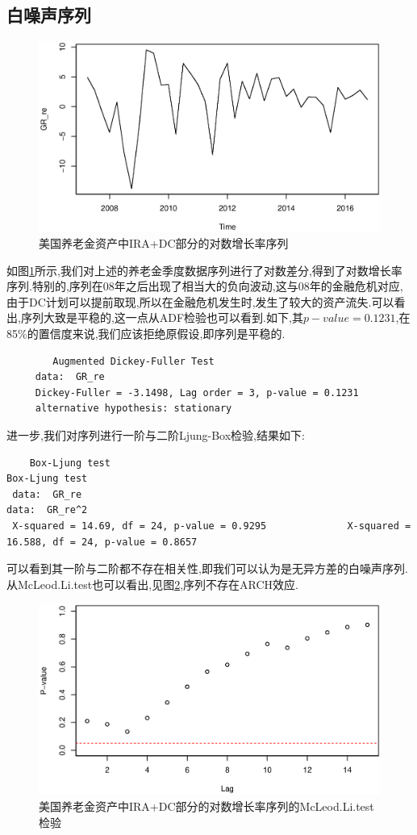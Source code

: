 \subsection{白噪声序列}
\begin{figure}[h!]
	\centering
	\includegraphics[width=0.5\linewidth]{pic/re/grre}
	\caption{美国养老金资产中IRA+DC部分的对数增长率序列}
	\label{fig:grre}
\end{figure}
如图\ref{fig:grre}所示,我们对上述的养老金季度数据序列进行了对数差分,得到了对数增长率序列.特别的,序列在08年之后出现了相当大的负向波动,这与08年的金融危机对应,由于DC计划可以提前取现,所以在金融危机发生时,发生了较大的资产流失.可以看出,序列大致是平稳的,这一点从ADF检验也可以看到.如下,其$p-value = 0.1231$,在85\%的置信度来说,我们应该拒绝原假设,即序列是平稳的.
\begin{framed}
	\begin{verbatim}
	 	Augmented Dickey-Fuller Test 
	 data:  GR_re
	 Dickey-Fuller = -3.1498, Lag order = 3, p-value = 0.1231
	 alternative hypothesis: stationary
	\end{verbatim}
\end{framed}
进一步,我们对序列进行一阶与二阶Ljung-Box检验,结果如下:
\begin{framed}
	\begin{verbatim}
 	Box-Ljung test                                                   Box-Ljung test
 data:  GR_re                                                       data:  GR_re^2
 X-squared = 14.69, df = 24, p-value = 0.9295              X-squared = 16.588, df = 24, p-value = 0.8657
	\end{verbatim}
\end{framed}
可以看到其一阶与二阶都不存在相关性,即我们可以认为是无异方差的白噪声序列.从McLeod.Li.test也可以看出,见图\ref{fig:mcre},序列不存在ARCH效应.
\begin{figure}[h!]
	\centering
	\includegraphics[width=0.5\linewidth]{pic/re/mcre}
	\caption{美国养老金资产中IRA+DC部分的对数增长率序列的McLeod.Li.test检验}
	\label{fig:mcre}
\end{figure}


